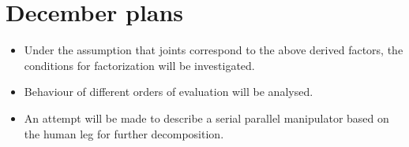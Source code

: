 \section{December plans}
\begin{itemize}
        \item Under the assumption that joints correspond to the above derived factors, the conditions for factorization will be investigated.
        \item Behaviour of different orders of evaluation will be analysed.
        \item An attempt will be made to describe a serial parallel manipulator based on the human leg for further decomposition.
\end{itemize}


        

